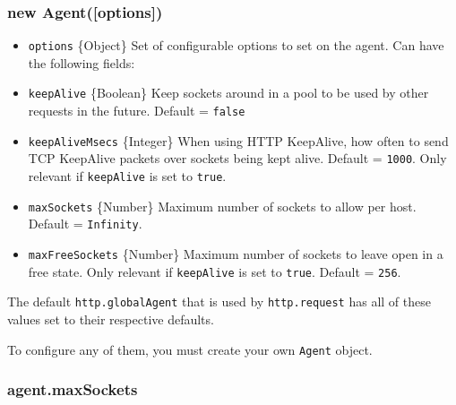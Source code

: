 \subsubsection{new Agent({[}options{]})}\label{new-agentoptions}

\begin{itemize}
\itemsep1pt\parskip0pt
\item
  \texttt{options} \{Object\} Set of configurable options to set on the
  agent. Can have the following fields:
\item
  \texttt{keepAlive} \{Boolean\} Keep sockets around in a pool to be
  used by other requests in the future. Default = \texttt{false}
\item
  \texttt{keepAliveMsecs} \{Integer\} When using HTTP KeepAlive, how
  often to send TCP KeepAlive packets over sockets being kept alive.
  Default = \texttt{1000}. Only relevant if \texttt{keepAlive} is set to
  \texttt{true}.
\item
  \texttt{maxSockets} \{Number\} Maximum number of sockets to allow per
  host. Default = \texttt{Infinity}.
\item
  \texttt{maxFreeSockets} \{Number\} Maximum number of sockets to leave
  open in a free state. Only relevant if \texttt{keepAlive} is set to
  \texttt{true}. Default = \texttt{256}.
\end{itemize}

The default \texttt{http.globalAgent} that is used by
\texttt{http.request} has all of these values set to their respective
defaults.

To configure any of them, you must create your own \texttt{Agent}
object.

\begin{Shaded}
\begin{Highlighting}[]
 \NormalTok{(}\NormalTok{);}
  \NormalTok{(\{ }\NormalTok{: } \NormalTok{\});}
\end{Highlighting}
\end{Shaded}

\subsubsection{agent.maxSockets}\label{agent.maxsockets}

